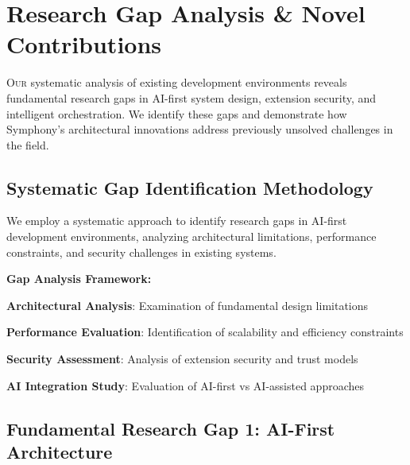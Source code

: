 
\section{Research Gap Analysis \& Novel Contributions}
\label{sec:research-gaps}

\vspace{0.5cm}
\lettrine{O}{ur} systematic analysis of existing development environments reveals fundamental research gaps in AI-first system design, extension security, and intelligent orchestration. We identify these gaps and demonstrate how Symphony's architectural innovations address previously unsolved challenges in the field.

\subsection{Systematic Gap Identification Methodology}
\label{subsec:gap-methodology}

We employ a systematic approach to identify research gaps in AI-first development environments, analyzing architectural limitations, performance constraints, and security challenges in existing systems.

\textbf{Gap Analysis Framework:}

\begin{infobox}[title=Research Gap Analysis Methodology]
\begin{compactlist}
    \item \textbf{Architectural Analysis}: Examination of fundamental design limitations
    \item \textbf{Performance Evaluation}: Identification of scalability and efficiency constraints
    \item \textbf{Security Assessment}: Analysis of extension security and trust models
    \item \textbf{AI Integration Study}: Evaluation of AI-first vs AI-assisted approaches
\end{compactlist}
\end{infobox}

\subsection{Fundamental Research Gap 1: AI-First Architecture}
\label{subsec:ai-first-gap}

